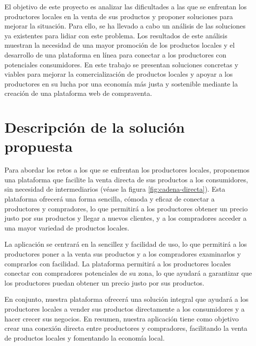 
El objetivo de este proyecto es analizar las dificultades a las que se enfrentan los productores locales en la venta de sus productos y proponer soluciones para mejorar la situación. Para ello, se ha llevado a cabo un análisis de las soluciones ya existentes para lidiar con este problema. Los resultados de este análisis muestran la necesidad de una mayor promoción de los productos locales y el desarrollo de una plataforma en línea para conectar a los productores con  potenciales consumidores. En este trabajo se presentan soluciones concretas y viables para mejorar la comercialización de productos locales y apoyar a los productores en su lucha por una economía más justa y sostenible mediante la creación de una plataforma web de compraventa.

\section{Descripción de la solución propuesta}\label{sec:descripcion-solucion}

Para abordar los retos a los que se enfrentan los productores locales, proponemos una plataforma que facilite la venta directa de sus productos a los consumidores, sin necesidad de intermediarios (véase la figura \ref{fig:cadena-directa}). Esta plataforma ofrecerá una forma sencilla, cómoda y eficaz de conectar a productores y compradores, lo que permitirá a los productores obtener un precio justo por sus productos y llegar a nuevos clientes, y a los compradores acceder a una mayor variedad de productos locales. 


La aplicación se centrará en la sencillez y facilidad de uso, lo que permitirá a los productores poner a la venta sus productos y a los compradores examinarlos y comprarlos con facilidad. La plataforma permitirá a los productores locales conectar con compradores potenciales de su zona, lo que ayudará a garantizar que los productores puedan obtener un precio justo por sus productos.

En conjunto, nuestra plataforma ofrecerá una solución integral que ayudará a los productores locales a vender sus productos directamente a los consumidores y a hacer crecer sus negocios. En resumen, nuestra aplicación tiene como objetivo crear una conexión directa entre productores y compradores, facilitando la venta de productos locales y fomentando la economía local.

